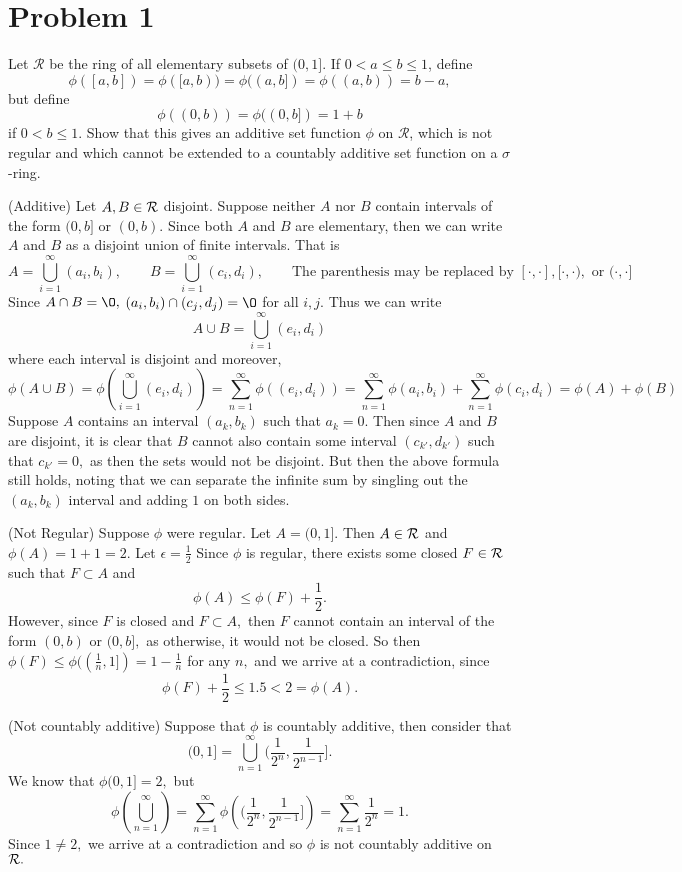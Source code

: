 \documentclass[11pt]{article}
\renewcommand{\emptyset}{\O}
\begin{document}
	
	
	\psetheader

\section*{Problem 1}
\begin{problem}
    Let $\mathcal{R}$ be the ring of all elementary subsets of $(0, 1]$. If $0 < a \leq b \leq 1$, define
\[
\phi([a, b]) = \phi([a, b)) = \phi((a, b]) = \phi((a, b)) = b - a,
\]
but define
\[
\phi((0, b)) = \phi((0, b]) = 1 + b
\]
if $0 < b \leq 1$. Show that this gives an additive set function $\phi$ on $\mathcal{R}$, which is not regular and which cannot be extended to a countably additive set function on a $\sigma$-ring.
\end{problem}
\begin{solution}
    (Additive) Let $A, B \in \cal R$ disjoint. Suppose neither $A$ nor $B$ contain intervals of the form $(0,b]$ or $(0,b).$ Since both $A$ and $B$ are elementary, then we can write $A$ and $B$ as a disjoint union of finite intervals. That is \[A = \bigcup_{i=1}^\infty (a_i, b_i), \qquad B = \bigcup_{i=1}^\infty (c_i, d_i), \qquad \text{The parenthesis may be replaced by $[\cdot,\cdot], [\cdot,\cdot),$ or $(\cdot,\cdot]$}\] Since $A \cap B  = \emptyset,$ $(a_i, b_i) \cap (c_j, d_j) = \emptyset$ for all $i,j.$ Thus we can write 
    \[A \cup B = \bigcup_{i=1}^\infty (e_i, d_i)\] where each interval is disjoint and moreover, 
    \[\phi(A \cup B) =\phi\left( \bigcup_{i=1}^\infty (e_i, d_i)\right) = \sum_{n=1}^\infty \phi((e_i, d_i)) = \sum_{n=1}^\infty \phi(a_i, b_i) + \sum_{n=1}^\infty \phi(c_i, d_i) = \phi(A) + \phi(B)\]
    Suppose $A$ contains an interval $(a_k,b_k)$ such that $a_k = 0.$ Then since $A$ and $B$ are disjoint, it is clear that $B$ cannot also contain some interval $(c_{k'}, d_{k'})$ such that $c_{k'} = 0,$ as then the sets would not be disjoint. But then the above formula still holds, noting that we can separate the infinite sum by singling out the $(a_k, b_k)$ interval and adding $1$ on both sides. 

    (Not Regular) Suppose $\phi$ were regular. Let $A = (0, 1].$ Then $A \in \cal R$ and $\phi(A) = 1 + 1 = 2.$ Let $\epsilon = \frac{1}{2}$ Since $\phi$ is regular, there exists some closed $F \in \cal R$ such that $F \subset A$ and \[\phi(A) \leq \phi(F) + \frac{1}{2}.\] However, since $F$ is closed and $F\subset A,$ then $F$ cannot contain an interval of the form $(0,b)$ or $(0,b],$ as otherwise, it would not be closed. So then $\phi(F) \leq \phi((\frac{1}{n}, 1]) = 1-\frac{1}{n}$ for any $n,$ and we arrive at a contradiction, since \[\phi(F) + \frac{1}{2} \leq 1.5 < 2 = \phi(A).\]

    (Not countably additive) Suppose that $\phi$ is countably additive, then consider that 
    \[(0,1] = \bigcup_{n=1}^\infty (\frac{1}{2^n},\frac{1}{2^{n-1}}].\] We know that $\phi(0,1] = 2,$ but 
    \[\phi\left(\bigcup_{n=1}^\infty \right) = \sum_{n=1}^\infty \phi\left((\frac{1}{2^n},\frac{1}{2^{n-1}}]\right) = \sum_{n=1}^\infty \frac{1}{2^n} = 1.\] Since $1\neq 2,$ we arrive at a contradiction and so $\phi$ is not countably additive on $\cal R.$
\end{solution}
\end{document}
